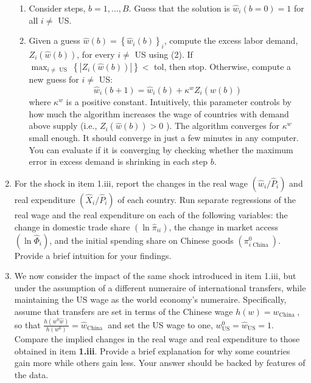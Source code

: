 \documentclass[12pt,oneside,reqno]{article}
\begin{document}
\begin{enumerate}[leftmargin=*, label=\textbf{(\roman*)}]
    \begin{enumerate}[leftmargin=*,label=\textbf{(\alph*)}]
        \item Consider steps, $b=1, \ldots, B$. Guess that the solution is $\hat{w}_{i}(b=0)=1$ for all $i \neq$ US.
        \item Given a guess $\hat{w}(b)=\left\{\hat{w}_{i}(b)\right\}_{i}$, compute the excess labor demand, $Z_{i}(\hat{w}(b))$, for every $i \neq$ US using (2). If $\max _{i \neq \text { US }}\left\{\left|Z_{i}(\hat{w}(b))\right|\right\}<$ tol, then stop. Otherwise, compute a new guess for $i \neq$ US:
        \begin{equation*}
            \hat{w}_{i}(b+1)=\hat{w}_{i}(b)+\kappa^{w} Z_{i}(\hat{w}(b))
        \end{equation*}
        where $\kappa^{w}$ is a positive constant. Intuitively, this parameter controls by how much the algorithm increases the wage of countries with demand above supply (i.e., $Z_{i}(\hat{w}(b))>0$ ). The algorithm converges for $\kappa^{w}$ small enough. It should converge in just a few minutes in any computer. You can evaluate if it is converging by checking whether the maximum error in excess demand is shrinking in each step $b$.
    \end{enumerate}
    \item For the shock in item 1.iii, report the changes in the real wage $\left(\hat{w}_{i} / \hat{P}_{i}\right)$ and real expenditure $\left(\hat{X}_{i} / \hat{P}_{i}\right)$ of each country. Run separate regressions of the real wage and the real expenditure on each of the following variables: the change in domestic trade share $\left(\ln \hat{\pi}_{i i}\right)$, the change in market access $\left(\ln \hat{\Phi}_{i}\right)$, and the initial spending share on Chinese goods $\left(\pi_{i \text { China }}^{0}\right)$. Provide a brief intuition for your findings.

    \item We now consider the impact of the same shock introduced in item 1.iii, but under the assumption of a different numeraire of international transfers, while maintaining the US wage as the world economy's numeraire. Specifically, assume that transfers are set in terms of the Chinese wage $h(w)=w_{\text {China }}$, so that $\frac{h\left(w^{0} \hat{w}\right)}{h\left(w^{0}\right)}=\hat{w}_{\text {China }}$ and set the US wage to one, $w_{\mathrm{US}}^{0}=\hat{w}_{\mathrm{US}}=1$. Compare the implied changes in the real wage and real expenditure to those obtained in item \textbf{1.iii}. Provide a brief explanation for why some countries gain more while others gain less. Your answer should be backed by features of the data.
\end{enumerate}
\clearpage
\end{document}
